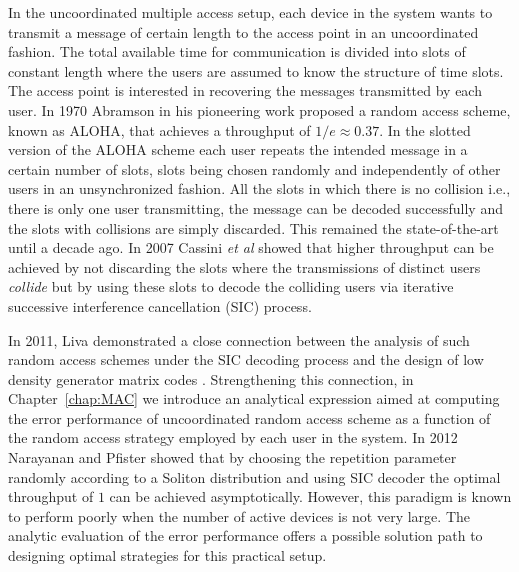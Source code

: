 In the uncoordinated multiple access setup, each device in the system wants to transmit a message of certain length to the access point in an uncoordinated fashion. The total available time for communication is divided into slots of constant length where the users are assumed to know the structure of time slots. The access point is interested in recovering the messages transmitted by each user. In 1970 Abramson in his pioneering work \cite{abramson1970aloha} proposed a random access scheme, known as ALOHA, that achieves a throughput of $1/e\approx 0.37$. In the slotted version of the ALOHA scheme each user repeats the intended message in a certain number of slots, slots being chosen randomly and independently of other users in an unsynchronized fashion. All the slots in which there is no collision i.e., there is only one user transmitting, the message can be decoded successfully and the slots with collisions are simply discarded. This remained the state-of-the-art until a decade ago. In 2007 \cite{casini2007contention} Cassini \textit{et al} showed that higher throughput can be achieved by not discarding the slots where the transmissions of distinct users \textit{collide} but by using these slots to decode the colliding users via iterative successive interference cancellation (SIC) process. 

In 2011, Liva demonstrated a close connection between the analysis of such random access schemes under the SIC decoding process and the design of low density generator matrix codes \cite{liva2011graph}. Strengthening this connection, in Chapter~\ref{chap:MAC} we introduce an analytical expression aimed at computing the error performance of uncoordinated random access scheme as a function of the random access strategy employed by each user in the system. In 2012 Narayanan and Pfister showed that by choosing the repetition parameter randomly according to a Soliton distribution and using SIC decoder the optimal throughput of $1$ can be achieved asymptotically\cite{narayanan2012iterative}. However, this paradigm is known to perform poorly when the number of active devices is not very large. The analytic evaluation of the error performance offers a possible solution path to designing optimal strategies for this practical setup.

